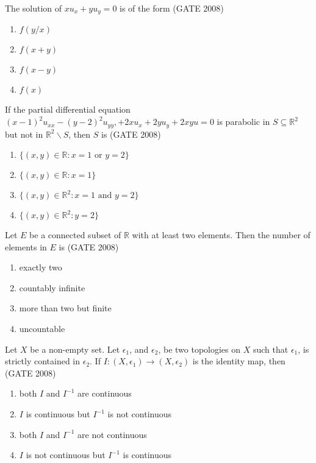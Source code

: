 \item{The solution of $xu_x + yu_y =0$ is of the form \hfill (GATE 2008)
\begin{multicols}{4}
    \begin{enumerate}
        \item $f(y/x)$
        \item $f(x+y) $
        \item $f(x-y)$
        \item $f(x)$
    \end{enumerate}
\end{multicols}}

\item{ If the partial differential equation $(x-1)^2 u_{xx}-(y-2)^2u_{yy}, +2xu_x + 2yu_y +2xyu=0$ is parabolic in $S \subseteq \mathbb{R}^2$ but not in $\mathbb{R}^2\backslash S$, then $S$ is \hfill (GATE 2008)
\begin{multicols}{2}
    \begin{enumerate}
        \item $\{(x, y) \in \mathbb{R}:x=1 \text{ or } y=2\}$
        \item $\{(x,y) \in \mathbb{R}:x=1\}$
        \item $\{(x, y) \in \mathbb{R}^2:x=1 \text{ and } y = 2\}$
        \item $\{(x, y) \in \mathbb{R}^2: y=2\}$
    \end{enumerate}
\end{multicols}




}

\item{ Let $E$ be a connected subset of $\mathbb{R}$ with at least two elements. Then the number of elements in $E$ is \hfill (GATE 2008)
\begin{multicols}{2}
    \begin{enumerate}
        \item exactly two
        \item countably infinite
        \item more than two but finite 
        \item uncountable
    \end{enumerate}
\end{multicols}
}

\item{ Let $X$ be a non-empty set. Let $\epsilon_1$, and $\epsilon_2$, be two topologies on $X$ such that $\epsilon_1$, is strictly contained in $\epsilon_2$. If $I: (X,\epsilon_1)\rightarrow (X,\epsilon_2)$ is the identity map, then \hfill (GATE 2008)
    \begin{enumerate}
        \item both $I$ and $I^{-1}$ are continuous
        \item $I$ is continuous but $I^{-1}$ is not continuous
        \item both $I$ and $I^{-1}$ are not continuous
        \item $I$ is not continuous but $I^{-1}$ is continuous
    \end{enumerate}
}


